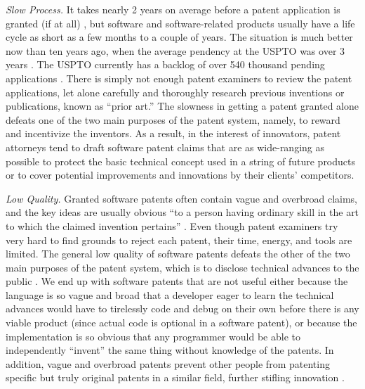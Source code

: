 \documentclass[12pt]{texMemo} %
\begin{document}
\textit{Slow Process.} It takes nearly 2 years on average before a patent application is granted (if at all) \cite{data}, but software and software-related products usually have a life cycle as short as a few months to a couple of years. The situation is much better now than ten years ago, when the average pendency at the USPTO was over 3 years \cite{pendency}. The USPTO currently has a backlog of over 540 thousand pending applications \cite{data}. There is simply not enough patent examiners to review the patent applications, let alone carefully and thoroughly research previous inventions or publications, known as “prior art.” The slowness in getting a patent granted alone defeats one of the two main purposes of the patent system, namely, to reward and incentivize the inventors. As a result, in the interest of innovators, patent attorneys tend to draft software patent claims that are as wide-ranging as possible to protect the basic technical concept used in a string of future products or to cover potential improvements and innovations by their clients’ competitors.

\textit{Low Quality.} Granted software patents often contain vague and overbroad claims, and the key ideas are usually obvious “to a person having ordinary skill in the art to which the claimed invention pertains” \cite{35usc103}. Even though patent examiners try very hard to find grounds to reject each patent, their time, energy, and tools are limited. The general low quality of software patents defeats the other of the two main purposes of the patent system, which is to disclose technical advances to the public \cite{decarvalho}. We end up with software patents that are not useful either because the language is so vague and broad that a developer eager to learn the technical advances would have to tirelessly code and debug on their own before there is any viable product (since actual code is optional in a software patent), or because the implementation is so obvious that any programmer would be able to independently “invent” the same thing without knowledge of the patents. In addition, vague and overbroad patents prevent other people from patenting specific but truly original patents in a similar field, further stifling innovation \cite{kamdar}.
\end{document}
